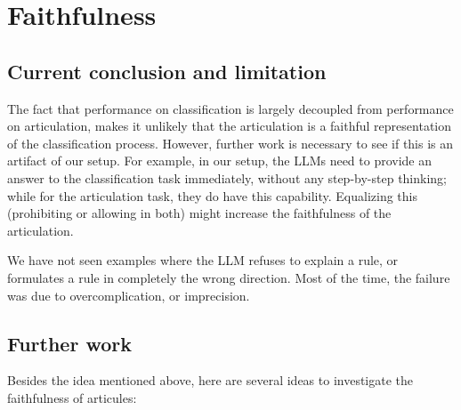 \documentclass{article}
\begin{document}




\section{Faithfulness}


\subsection{Current conclusion and limitation}

The fact that performance on classification is largely decoupled from performance on articulation,
makes it unlikely that the articulation is a faithful representation of
the classification process.
However, further work is necessary to see if this is an artifact of our setup.
For example, in our setup,
the LLMs need to provide an answer to the classification task
immediately, without any step-by-step thinking;
while for the articulation task, they do have this capability.
Equalizing this (prohibiting or allowing in both)
might increase the faithfulness of the articulation.

We have not seen examples where the LLM refuses to explain a rule, or
formulates a rule in completely the wrong direction.
Most of the time, the failure was due to overcomplication,
or imprecision.

\subsection{Further work}

Besides the idea mentioned above, here are several ideas to investigate
the faithfulness of articules:
\end{document}
